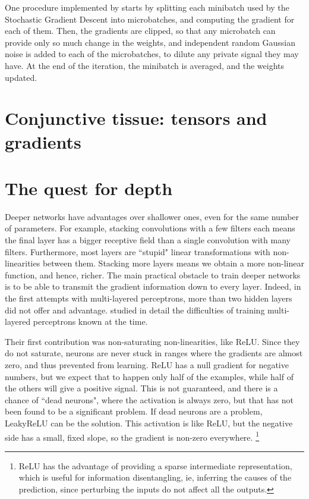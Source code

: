 One procedure implemented by \citet{tf_privacy} starts by splitting each minibatch used by the Stochastic Gradient Descent into microbatches, and computing the gradient for each of them.
Then, the gradients are clipped, so that any microbatch can provide only so much change in the weights, and independent random Gaussian noise is added to each of the microbatches, to dilute any private signal they may have.
At the end of the iteration, the minibatch is averaged, and the weights updated.


\section[Tensors and gradients]{Conjunctive tissue: tensors and gradients}



\section{The quest for depth}\label{sec:depth}
Deeper networks have advantages over shallower ones, even for the same number of parameters.
For example, stacking convolutions with a few filters each means the final layer has a bigger receptive field than a single convolution with many filters.
Furthermore, most layers are ``stupid" linear transformations with non-linearities between them.
Stacking more layers means we obtain a more non-linear function, and hence, richer.
The main practical obstacle to train deeper networks is to be able to transmit the gradient information down to every layer.
Indeed, in the first attempts with multi-layered perceptrons, more than two hidden layers did not offer and advantage.
\citet{glorot} studied in detail the difficulties of training multi-layered perceptrons known at the time.

Their first contribution  was non-saturating non-linearities, like ReLU.
Since they do not saturate, neurons are never stuck in ranges where the gradients are almost zero, and thus prevented from learning.
ReLU has a null gradient for negative numbers, but we expect that to happen only half of the examples, while half of the others will give a positive signal.
This is not guaranteed, and there is a chance of ``dead neurons", where the activation is always zero, but that has not been found to be a significant problem.
If dead neurons are a problem, LeakyReLU   can be the solution.
This activation is like ReLU, but the negative side has a small, fixed slope, so the gradient is non-zero everywhere.
\footnote{ReLU has the advantage of providing a sparse intermediate representation, which is useful for information disentangling, ie, inferring the causes of the prediction, since perturbing the inputs do not affect all the outputs.}

